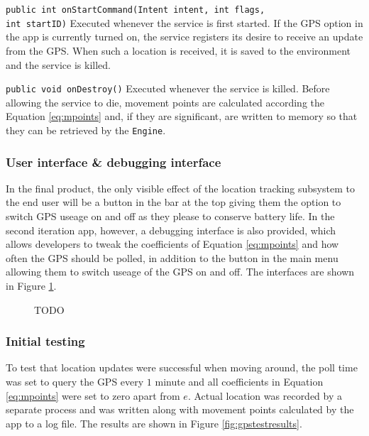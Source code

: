 \documentclass[12pt,a4paper,twoside]{article}
\begin{document}
\verb=public int onStartCommand(Intent intent, int flags,=\newline
\verb=                          int startID)=\newline
Executed whenever the service is first started. If the GPS option in the app is currently turned on, the service registers its desire to receive an update from the GPS. When such a location is received, it is saved to the environment and the service is killed.

\verb=public void onDestroy()=\newline
Executed whenever the service is killed. Before allowing the service to die, movement points are calculated according the Equation \ref{eq:mpoints} and, if they are significant, are written to memory so that they can be retrieved by the \verb=Engine=.

\subsubsection{User interface \& debugging interface}
In the final product, the only visible effect of the location tracking subsystem to the end user will be a button in the bar at the top giving them the option to switch GPS useage on and off as they please to conserve battery life. In the second iteration app, however, a debugging interface is also provided, which allows developers to tweak the coefficients of Equation \ref{eq:mpoints} and how often the GPS should be polled, in addition to the button in the main menu allowing them to switch useage of the GPS on and off. The interfaces are shown in Figure \ref{fig:gpsinterface}.

\begin{figure}
\label{fig:gpsinterface}

\caption{TODO}
\end{figure}

\subsubsection{Initial testing}
To test that location updates were successful when moving around, the poll time was set to query the GPS every $1$ minute and all coefficients in Equation \ref{eq:mpoints} were set to zero apart from $e$. Actual location was recorded by a separate process and was written along with movement points calculated by the app to a log file. The results are shown in Figure \ref{fig:gpstestresults}.
\end{document}
